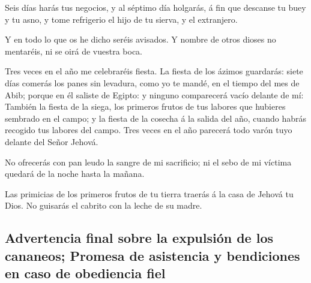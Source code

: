  Seis días harás tus negocios, y al séptimo día holgarás,
á fin que descanse tu buey y tu asno, y tome refrigerio el hijo de tu
sierva, y el extranjero.

 Y en todo lo que os he dicho seréis avisados. Y nombre
de otros dioses no mentaréis, ni se oirá de vuestra boca.

 Tres veces en el año me celebraréis fiesta.
 La fiesta de los ázimos guardarás: siete días comerás
los panes sin levadura, como yo te mandé, en el tiempo del mes de Abib;
porque en él saliste de Egipto: y ninguno comparecerá vacío delante de
mí:  También la fiesta de la siega, los primeros frutos
de tus labores que hubieres sembrado en el campo; y la fiesta de la
cosecha á la salida del año, cuando habrás recogido tus labores del
campo.  Tres veces en el año parecerá todo varón tuyo
delante del Señor Jehová.

 No ofrecerás con pan leudo la sangre de mi sacrificio;
ni el sebo de mi víctima quedará de la noche hasta la mañana.

 Las primicias de los primeros frutos de tu tierra
traerás á la casa de Jehová tu Dios. No guisarás el cabrito con la leche
de su madre.

\hypertarget{advertencia-final-sobre-la-expulsiuxf3n-de-los-cananeos-promesa-de-asistencia-y-bendiciones-en-caso-de-obediencia-fiel}{%
\subsection{Advertencia final sobre la expulsión de los cananeos;
Promesa de asistencia y bendiciones en caso de obediencia
fiel}\label{advertencia-final-sobre-la-expulsiuxf3n-de-los-cananeos-promesa-de-asistencia-y-bendiciones-en-caso-de-obediencia-fiel}}

